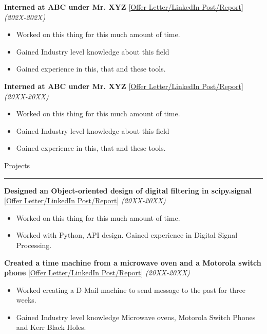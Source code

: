 \documentclass[10pt, hidelinks]{article}
\begin{document}
	{\vspace*{-3mm}\normalsize\textbf{Interned at ABC under Mr. XYZ}} {\small[\href{https://httpbin.com}{Offer Letter/LinkedIn Post/Report}]} \hspace*{8pt} {\normalsize\textit{(202X-202X)}}
	{\vspace*{-3mm}
	\begin{itemize}
		\itemsep-0.3em
		\item Worked on this thing for this much amount of time.
		\item Gained Industry level knowledge about this field
		\item Gained experience in this, that and these tools.
	\end{itemize}
	}
	{\vspace*{-3mm}\normalsize\textbf{Interned at ABC under Mr. XYZ}} {\small[\href{https://httpbin.com}{Offer Letter/LinkedIn Post/Report}]} \hspace*{8pt} {\normalsize\textit{(20XX-20XX)}}
	{\vspace*{-3mm}
	\begin{itemize}
		\itemsep-0.3em
		\item Worked on this thing for this much amount of time.
		\item Gained Industry level knowledge about this field
		\item Gained experience in this, that and these tools.
	\end{itemize}
	}


	{\large\color{RoyalBlue}Projects}
	\par\noindent\rule[7pt]{\textwidth}{0.1pt}

	{\vspace*{-3mm}\normalsize\textbf{Designed an Object-oriented design of digital filtering in scipy.signal}} {\small[\href{https://httpbin.com}{Offer Letter/LinkedIn Post/Report}]} \hspace*{8pt} {\normalsize\textit{(20XX-20XX)}}
	{\vspace*{-3mm}
	\begin{itemize}
		\itemsep-0.3em
		\item Worked on this thing for this much amount of time.
		\item Worked with Python, API design. Gained experience in Digital Signal Processing.
	\end{itemize}
	}
	{\vspace*{-3mm}\normalsize\textbf{Created a time machine from a microwave oven and a Motorola switch phone}} {\small[\href{https://httpbin.com}{Offer Letter/LinkedIn Post/Report}]} \hspace*{8pt} {\normalsize\textit{(20XX-20XX)}}
	{\vspace*{-3mm}
	\begin{itemize}
		\itemsep-0.3em
		\item Worked creating a D-Mail machine to send message to the past for three weeks.
		\item Gained Industry level knowledge Microwave ovens, Motorola Switch Phones and Kerr Black Holes.
	\end{itemize}
	}
\end{document}
